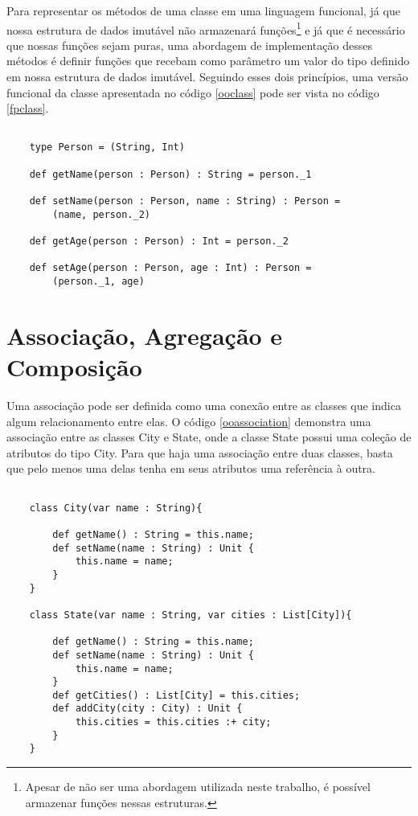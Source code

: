 Para representar os métodos de uma classe em uma 
linguagem funcional, já que nossa estrutura de dados 
imutável não armazenará funções\footnote{Apesar de não 
ser uma abordagem utilizada neste trabalho, é 
possível armazenar funções nessas estruturas.} e já 
que é necessário que nossas funções sejam puras, 
uma abordagem de implementação desses 
métodos é definir funções que recebam 
como parâmetro um valor do tipo definido em nossa 
estrutura de dados imutável. Seguindo esses dois 
princípios, uma versão funcional da classe apresentada 
no código \ref{ooclass} pode ser vista no código \ref{fpclass}.


\begin{lstlisting}[caption={Representação de uma classe no contexto funcional},label=fpclass]
    
    type Person = (String, Int)

    def getName(person : Person) : String = person._1 

    def setName(person : Person, name : String) : Person = 
        (name, person._2)

    def getAge(person : Person) : Int = person._2

    def setAge(person : Person, age : Int) : Person =
        (person._1, age)

\end{lstlisting}

\section{Associação, Agregação e Composição}

Uma associação pode ser definida como uma 
conexão entre as classes que indica algum 
relacionamento entre elas\cite{Sommerville10}. 
O código \ref{ooassociation} demonstra uma 
associação entre as classes City e State, onde 
a classe State possui uma coleção de atributos 
do tipo City. Para que haja uma associação 
entre duas classes, basta que pelo menos 
uma delas tenha em seus atributos uma 
referência à outra.

\begin{lstlisting}[caption={Exemplo de associação entre classes},label=ooassociation]
    
    class City(var name : String){

        def getName() : String = this.name;
        def setName(name : String) : Unit {
            this.name = name;
        }
    }

    class State(var name : String, var cities : List[City]){

        def getName() : String = this.name;
        def setName(name : String) : Unit {
            this.name = name;
        }
        def getCities() : List[City] = this.cities;
        def addCity(city : City) : Unit {
            this.cities = this.cities :+ city;
        }
    }

\end{lstlisting}

